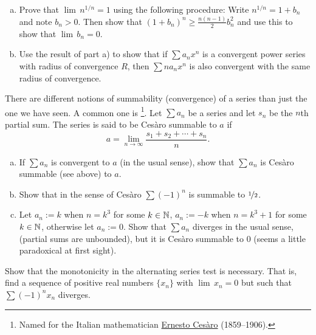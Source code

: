 \begin{samepage}
\begin{exercise}
\leavevmode
\begin{enumerate}[a)]
\item
Prove that $\lim \, n^{1/n} = 1$ using the following procedure:  Write $n^{1/n} = 1+b_n$ and
note $b_n > 0$.  Then show that ${(1+b_n)}^n \geq 
\frac{n(n-1)}{2}b_n^2$ and use this to show that $\lim \, b_n = 0$.
\item
Use the result of part a) to show that
if $\sum a_n x^n$ is a convergent power series with radius of convergence $R$,
then $\sum n a_n x^n$ is also convergent with the same radius of convergence.
\end{enumerate}
\end{exercise}
\end{samepage}

\begin{exnote}
There are different notions of summability (convergence)
of a series
than just the one we have seen.
A common one is \emph{}%
\footnote{Named for the Italian mathematician
\href{https://en.wikipedia.org/wiki/Ernesto_Ces\%C3\%A0ro}{Ernesto Ces\`aro}
(1859--1906).}.  Let $\sum a_n$ be a series
and let $s_n$ be the $n$th partial sum.  The series is said to
be Ces\`aro summable to $a$ if
\begin{equation*}
a = \lim_{n\to \infty} \frac{s_1 + s_2 + \cdots + s_n}{n} .
\end{equation*}
\end{exnote}

\begin{exercise}[Challenging]
\leavevmode
\begin{enumerate}[a)]
\item
If $\sum a_n$ is convergent to $a$ (in the usual sense), show that
$\sum a_n$ is Ces\`aro summable (see above) to $a$.
\item
Show that in the sense of Ces\`aro $\sum {(-1)}^n$ is summable to
$\nicefrac{1}{2}$.
\item
Let $a_n := k$ when $n = k^3$ for some $k \in {\mathbb{N}}$,
$a_n := -k$ when $n = k^3+1$ for some $k \in {\mathbb{N}}$,
otherwise
let $a_n := 0$.  Show that $\sum a_n$ diverges in the usual sense,
(partial sums are unbounded), but it is
Ces\`aro summable to 0 (seems a little paradoxical at first sight).
\end{enumerate}
\end{exercise}

\begin{exercise}[Challenging]
Show that the monotonicity in the alternating series test
is necessary.  That is, find a sequence of positive real numbers
$\{ x_n \}$ with $\lim\, x_n = 0$ but such that
$\sum {(-1)}^n x_n$ diverges.
\end{exercise}

